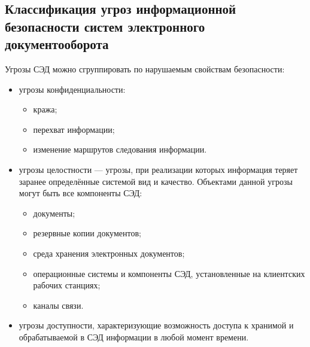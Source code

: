 \subsection{Классификация угроз информационной безопасности систем электронного документооборота} \label{threats_classification}

Угрозы СЭД можно сгруппировать по нарушаемым свойствам безопасности: 
\begin{itemize}
	\item угрозы конфиденциальности:
	\begin{itemize}
		\item кража;
		\item перехват информации;
		\item изменение маршрутов следования информации.
	\end{itemize}
	\item угрозы целостности --- угрозы, при реализации которых информация теряет заранее определённые системой вид и качество. Объектами данной угрозы могут быть все компоненты СЭД:
	\begin{itemize}
		\item документы;
		\item резервные копии документов;
		\item среда хранения электронных документов;
		\item операционные системы и компоненты СЭД, установленные на клиентских рабочих станциях;
		\item каналы связи.
	\end{itemize}
	\item угрозы доступности, характеризующие возможность доступа к хранимой и обрабатываемой в СЭД информации в любой момент времени.
\end{itemize}

